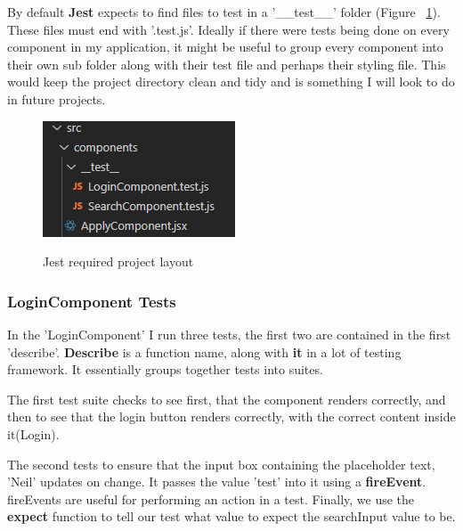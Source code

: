 By default \textbf{Jest} expects to find files to test in a '\_\_test\_\_' folder (Figure ~\ref{test4_label}). These files must end with '.test.js'. Ideally if there were tests being done on every component in my application, it might be useful to group every component into their own sub folder along with their test file and perhaps their styling file. This would keep the project directory clean and tidy and is something I will look to do in future projects.

\begin{figure}[ht]
    \centering
    \includegraphics[scale=0.8]{Images/test4.png} 
    \label{test4_label}
    \caption{Jest required project layout}
\end{figure}

\subsubsection{LoginComponent Tests}
In the 'LoginComponent' I run three tests, the first two are contained in the first 'describe'. \textbf{Describe} is a function name, along with \textbf{it} in a lot of testing framework. It essentially groups together tests into suites.

The first test suite checks to see first, that the component renders correctly, and then to see that the login button renders correctly, with the correct content inside it(Login).

The second tests to ensure that the input box containing the placeholder text, 'Neil' updates on change. It passes the value 'test' into it using a \textbf{fireEvent}. fireEvents are useful for performing an action in a test. Finally, we use the \textbf{expect} function to tell our test what value to expect the searchInput value to be.

